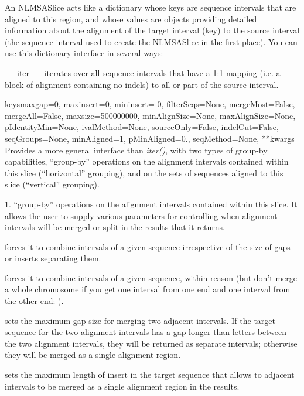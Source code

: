 \documentclass{howto}
\begin{document}
An NLMSASlice acts like a dictionary whose keys are
sequence intervals that are aligned to this region, and whose values are
 objects providing detailed information about the alignment of
the target interval (key) to the source interval (the sequence interval
used to create the NLMSASlice in the first place).  You can use this
dictionary interface in several ways:


\begin{funcdesc}{__iter__}{}
  iterates over all sequence intervals that have
  a 1:1 mapping (i.e. a block of alignment containing no indels) to
  all or part of the source interval.
\end{funcdesc}


\begin{funcdesc}{keys}{maxgap=0, maxinsert=0, mininsert= 0, filterSeqs=None, mergeMost=False, mergeAll=False, maxsize=500000000, minAlignSize=None, maxAlignSize=None, pIdentityMin=None, ivalMethod=None, sourceOnly=False, indelCut=False, seqGroups=None, minAligned=1, pMinAligned=0., seqMethod=None, **kwargs}
  Provides a more general interface than {\em iter()}, with two types of 
  group-by capabilities, ``group-by'' operations on the alignment intervals
  contained within this slice (``horizontal'' grouping), 
  and on the sets of sequences aligned
  to this slice (``vertical'' grouping).

  1. ``group-by'' operations on the alignment intervals
  contained within this slice.  It allows the user to supply
  various parameters for controlling when alignment intervals will be
  merged or split in the results that it returns.

  forces it to combine intervals of a given sequence irrespective
  of the size of gaps or inserts separating them.

  forces it to combine intervals of a given sequence, within reason
  (but don't merge a whole chromosome if you get one interval from one end
  and one interval from the other end:
  ).

   sets the
  maximum gap size for merging two adjacent intervals.  If the target sequence
  for the two alignment intervals has a gap longer than  
  letters between the two alignment intervals, they will be returned as
  separate intervals; otherwise they will be merged as a single alignment
  region.

   sets the maximum length of insert in the target
  sequence that allows to adjacent intervals to be merged as a single alignment
  region in the results.


\end{funcdesc}
\end{document}

